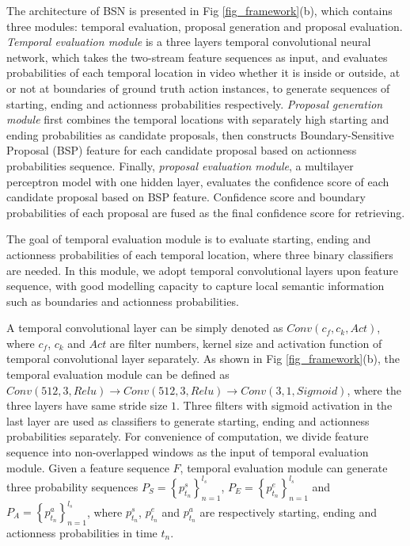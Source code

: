 \documentclass[runningheads]{llncs}
\begin{document}
The architecture of BSN is presented in Fig \ref{fig_framework}(b), which contains three modules: temporal evaluation, proposal generation  and proposal evaluation. 
\emph{Temporal evaluation module} is a three layers temporal convolutional neural network, which  takes the two-stream feature sequences as input, and evaluates probabilities of each temporal location in video whether it is inside or outside, at or not at boundaries of ground truth action instances, to generate sequences of starting, ending and actionness probabilities respectively. %
\emph{Proposal generation module} first combines the temporal locations with separately high starting and ending probabilities as candidate proposals, then constructs Boundary-Sensitive Proposal (BSP) feature for each candidate proposal based on  actionness probabilities sequence. 
Finally, \emph{proposal evaluation module}, a multilayer perceptron model with one hidden layer, evaluates the confidence score of each candidate proposal based on BSP feature.
Confidence score and boundary probabilities of each proposal are fused as the final confidence score for retrieving. 

The goal of temporal evaluation module is to evaluate starting, ending and actionness probabilities of each temporal location, where three binary classifiers are needed. In this module, we adopt temporal convolutional layers upon feature sequence, with good modelling capacity to capture local semantic information such as boundaries and actionness probabilities.

A temporal convolutional layer can be simply  denoted as $Conv(c_f,c_k,Act)$, where $c_f$, $c_k$ and $Act$ are filter numbers, kernel size and activation function of temporal convolutional layer separately. As shown in Fig \ref{fig_framework}(b), the temporal evaluation module can be defined as $Conv(512,3,Relu)\rightarrow Conv(512,3,Relu)\rightarrow Conv(3,1,Sigmoid)$, where the three layers have same stride size $1$. 
Three filters with sigmoid activation in the last layer are used as classifiers to generate starting, ending and actionness probabilities separately.
For convenience of computation, we divide feature sequence  into non-overlapped windows as the input of temporal evaluation module. 
Given a feature sequence $F$, temporal evaluation module can  generate three probability sequences $P_S=\left \{ p^s_{t_n} \right \}_{n=1}^{l_s}$, $P_E=\left \{ p^e_{t_n} \right \}_{n=1}^{l_s}$ and $P_A=\left \{ p^a_{t_n} \right \}_{n=1}^{l_s}$, where $p^s_{t_n}$, $p^e_{t_n}$ and $p^a_{t_n}$ are respectively starting, ending and actionness probabilities in time $t_n$.
\end{document}
